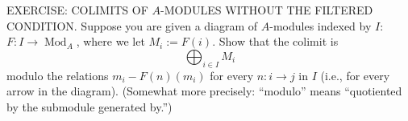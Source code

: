 EXERCISE: COLIMITS OF $A$-MODULES WITHOUT THE FILTERED CONDITION. Suppose you are given a diagram of $A$-modules indexed by $I$: $F:I\to\operatorname{Mod}_A$, where we let $M_i:=F(i)$. Show that the colimit is
$$\bigoplus_{i\in I}M_i$$
modulo the relations $m_i-F(n)(m_i)$ for every $n:i\to j$ in $I$ (i.e., for every arrow in the diagram). (Somewhat more precisely: “modulo” means “quotiented by the submodule generated by.”)
